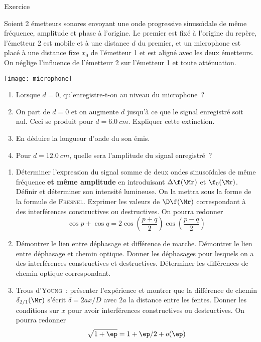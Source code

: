 \documentclass[a4paper, 12pt, final, garamond]{book}
\begin{document}
\begin{NCexem}{Exercice}
    \begin{minipage}{0.55\linewidth}
        Soient 2 émetteurs sonores envoyant une onde progressive sinusoïdale de
        même fréquence, amplitude et phase à l'origine. Le premier est fixé à
        l'origine du repère, l'émetteur 2 est mobile et à une distance $d$ du
        premier, et un microphone est placé à une distance fixe $x_0$ de
        l'émetteur 1 et est aligné avec les deux émetteurs. On néglige
        l'influence de l'émetteur 2 sur l'émetteur 1 et toute atténuation.
    \end{minipage}
    \hfill
    \begin{minipage}{0.45\linewidth}
        \begin{center}
            \texttt{[image: microphone]}
        \end{center}
    \end{minipage}
    \begin{enumerate}[label=\sqenumi]
        \item Lorsque $d=0$, qu'enregistre-t-on au niveau du microphone~?
        \item On part de $d=0$ et on augmente $d$ jusqu'à ce que le signal
            enregistré soit nul. Ceci se produit pour $d = \SI{6.0}{cm}$.
            Expliquer cette extinction.
        \item En déduire la longueur d'onde du son émis.
        \item Pour $d = \SI{12.0}{cm}$, quelle sera l'amplitude du signal
            enregistré~?
    \end{enumerate}
\end{NCexem}
\begin{enumerate}[resume]
    \item Déterminer l'expression du signal somme de deux ondes sinusoïdales de
        même fréquence \textbf{et même amplitude} en introduisant $\Delta
        \f(\Mr)$ et $\f_0(\Mr)$. Définir et déterminer son intensité lumineuse.
        On la mettra sous la forme de la formule de \textsc{Fresnel}. Exprimer
        les valeurs de $\D\f(\Mr)$ correspondant à des interférences
        constructives ou destructives. On pourra redonner\[\cos p + \cos q =
        2\cos \left( \frac{p+q}{2} \right)\cos \left( \frac{p-q}{2} \right)\]
    \item Démontrer le lien entre déphasage et différence de marche. Démontrer
        le lien entre déphasage et chemin optique. Donner les déphasages pour
        lesquels on a des interférences constructives et destructives.
        Déterminer les différences de chemin optique correspondant.
    \item Trous d'\textsc{Young}~: présenter l'expérience et montrer que la
        différence de chemin $\delta_{2/1}(\Mr)$ s'écrit \hfill $\delta =
        2ax/D$ avec $2a$ la distance entre les fentes. Donner les conditions sur
        $x$ pour avoir interférences constructives ou destructives. \smallbreak
        On pourra redonner
        \[\sqrt{1+\ep} = 1 + \ep/2 + o(\ep)\]
\end{enumerate}
\end{document}
